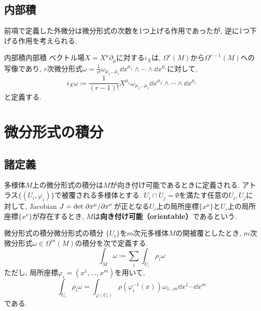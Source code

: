 \documentclass[../main.tex]{subfiles}
\begin{document}
\subsection{内部積}
    前項で定義した外微分は微分形式の次数を1つ上げる作用であったが, 逆に1つ下げる作用を考えられる.
    \begin{dfn}{内部積}{内部積}
        ベクトル場$X=X^\mu\partial_\mu$に対する$i_X$は, $\Omega^r(M)$から$\Omega^{r-1}(M)$への写像であり,
        $r$次微分形式$\displaystyle \omega = \frac{1}{r!}\omega_{\mu_1\ldots\mu_r} \dd{x}^{\mu_1} \wedge \cdots \wedge \dd{x}^{\mu_r}$に対して,
        \begin{equation}
            i_X \omega \coloneqq \frac{1}{(r-1)!} X^{\mu_1}\omega_{\mu_1\ldots\mu_r} \dd{x}^{\mu_2} \wedge \cdots \wedge \dd{x}^{\mu_r}
        \end{equation}
        と定義する.
    \end{dfn}

\section{微分形式の積分}
    \subsection{諸定義}
        多様体$M$上の微分形式の積分は$M$が向き付け可能であるときに定義される.
        アトラス$\{(U_i,\varphi_i)\}$で被覆される多様体とする.
        $U_i \cap U_j = \emptyset$を満たす任意の$U_i,U_j$に対して,
        Jacobian $J = \det\pdv*{x^\mu}{x^\nu}$が正となる$U_i$上の局所座標$\{x^\mu\}$と$U_i$上の局所座標$\{x^\nu\}$が存在するとき,
        $M$は\textbf{向き付け可能（orientable）}であるという.

        \begin{dfn}{微分形式の積分}{微分形式の積分}
            $\{U_i\}$を$m$次元多様体$M$の開被覆としたとき, $m$次微分形式$\omega\in\Omega^m(M)$の積分を次で定義する.
            \begin{equation}
                \int_M \omega \coloneqq \sum_i \int_{U_i} \rho_i\omega
            \end{equation}
            ただし, 局所座標$\varphi_i=(x^1,\ldots,x^m)$を用いて,
            \begin{equation}
                \int_{U_i} \rho_i\omega = \int_{\varphi(U_i)} \rho(\varphi_i^{-1}(x)) \omega_{1\ldots m} \dd{x^1} \cdots \dd{x^m}
            \end{equation}
            である.
        \end{dfn}
\end{document}
